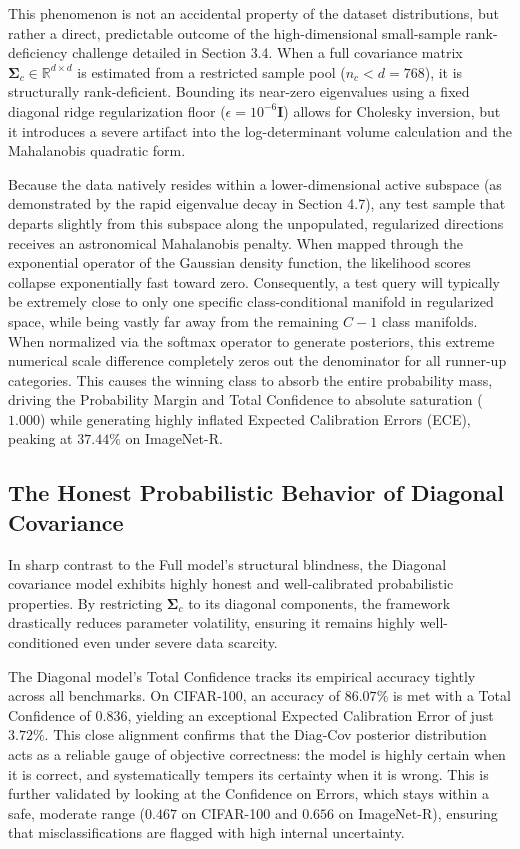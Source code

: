 This phenomenon is not an accidental property of the dataset distributions, but rather a direct, predictable outcome of the high-dimensional small-sample rank-deficiency challenge detailed in Section 3.4. When a full covariance matrix $\mathbf{\Sigma}_c \in \mathbb{R}^{d \times d}$ is estimated from a restricted sample pool ($n_c < d = 768$), it is structurally rank-deficient. Bounding its near-zero eigenvalues using a fixed diagonal ridge regularization floor ($\epsilon = 10^{-6}\mathbf{I}$) allows for Cholesky inversion, but it introduces a severe artifact into the log-determinant volume calculation and the Mahalanobis quadratic form. 

Because the data natively resides within a lower-dimensional active subspace (as demonstrated by the rapid eigenvalue decay in Section 4.7), any test sample that departs slightly from this subspace along the unpopulated, regularized directions receives an astronomical Mahalanobis penalty. When mapped through the exponential operator of the Gaussian density function, the likelihood scores collapse exponentially fast toward zero. Consequently, a test query will typically be extremely close to only one specific class-conditional manifold in regularized space, while being vastly far away from the remaining $C-1$ class manifolds. When normalized via the softmax operator to generate posteriors, this extreme numerical scale difference completely zeros out the denominator for all runner-up categories. This causes the winning class to absorb the entire probability mass, driving the Probability Margin and Total Confidence to absolute saturation ($1.000$) while generating highly inflated Expected Calibration Errors (ECE), peaking at $37.44\%$ on ImageNet-R.

\subsection{The Honest Probabilistic Behavior of Diagonal Covariance}
\label{sec:calibration:diagonal_honesty}

In sharp contrast to the Full model's structural blindness, the Diagonal covariance model exhibits highly honest and well-calibrated probabilistic properties. By restricting $\mathbf{\Sigma}_c$ to its diagonal components, the framework drastically reduces parameter volatility, ensuring it remains highly well-conditioned even under severe data scarcity.

The Diagonal model's Total Confidence tracks its empirical accuracy tightly across all benchmarks. On CIFAR-100, an accuracy of $86.07\%$ is met with a Total Confidence of $0.836$, yielding an exceptional Expected Calibration Error of just $3.72\%$. This close alignment confirms that the Diag-Cov posterior distribution acts as a reliable gauge of objective correctness: the model is highly certain when it is correct, and systematically tempers its certainty when it is wrong. This is further validated by looking at the Confidence on Errors, which stays within a safe, moderate range ($0.467$ on CIFAR-100 and $0.656$ on ImageNet-R), ensuring that misclassifications are flagged with high internal uncertainty.

